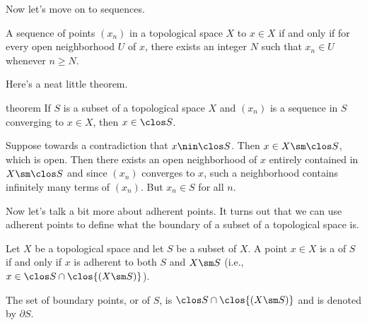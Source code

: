 \documentclass[class=article, crop=false]{standalone}
\begin{document}
Now let's move on to sequences.

\begin{defn}
  A sequence of points $(x_n)$ in a topological space $X$  to $x \in X$ if and only if for every open neighborhood $U$ of $x$, there exists an integer $N$ such that $x_n \in U$ whenever $n \geq N$.
\end{defn}

Here's a neat little theorem.

\begin{result}{theorem}
  If $S$ is a subset of a topological space $X$ and $(x_n)$ is a sequence in $S$ converging to $x \in X$, then $x \in \clos S$.
\end{result}
\begin{pf}
  Suppose towards a contradiction that $x \nin \clos S$. Then $x \in X \sm \clos S$, which is open. Then there exists an open neighborhood of $x$ entirely contained in $X \sm \clos S$ and since $(x_n)$ converges to $x$, such a neighborhood contains infinitely many terms of $(x_n)$. But $x_n \in S$ for all $n$.
\end{pf}

Now let's talk a bit more about adherent points. It turns out that we can use adherent points to define what the boundary of a subset of a topological space is.
\begin{defn}
  Let $X$ be a topological space and let $S$ be a subset of $X$. A point $x \in X$ is a  of $S$ if and only if $x$ is adherent to both $S$ and $X \sm S$ (i.e., $x \in \clos S \cap \clos{(X \sm S)}$).

  The set of boundary points, or  of $S$, is $\clos S \cap \clos{(X \sm S)}$ and is denoted by $\partial S$.
\end{defn}
\end{document}
